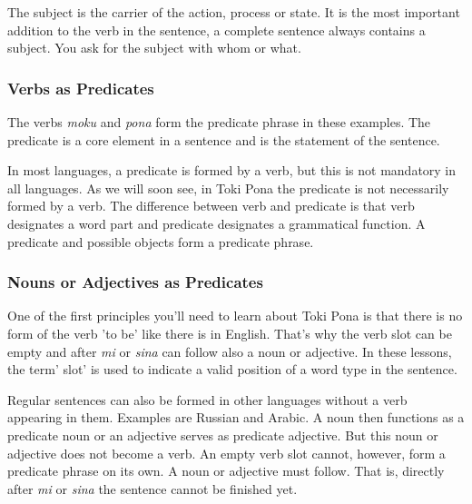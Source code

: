 The subject is the carrier of the action, process or state. 
It is the most important addition to the verb in the sentence, a complete sentence always contains a subject. 
You ask for the subject with whom or what.

%
\subsubsection*{Verbs as Predicates}
%

The verbs \textit{moku} and \textit{pona} form the predicate phrase in these examples.  
The predicate is a core element in a sentence and is the statement of the sentence. 

In most languages, a predicate is formed by a verb, but this is not mandatory in all languages. 
As we will soon see, in Toki Pona the predicate is not necessarily formed by a verb. 
The difference between verb and predicate is that verb designates a word part and predicate designates a grammatical function.
A predicate and possible objects form a predicate phrase. 
%
\subsubsection*{Nouns or Adjectives as Predicates}
%
%
%
One of the first principles you'll need to learn about Toki Pona is that there is no form of the verb 'to be' like there is in English. 
That's why the verb slot can be empty and after \textit{mi} or \textit{sina} can follow also a noun or adjective. 
In these lessons, the term' slot' is used to indicate a valid position of a word type in the sentence.


Regular sentences can also be formed in other languages without a verb appearing in them. 
Examples are Russian and Arabic. 
A noun then functions as a predicate noun or an adjective serves as predicate adjective.
But this noun or adjective does not become a verb. 
An empty verb slot cannot, however, form a predicate phrase on its own. 
A noun or adjective must follow. 
That is, directly after \textit{mi} or \textit{sina} the sentence cannot be finished yet.

